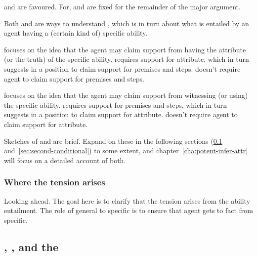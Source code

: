 \begin{note}
  \AR{} and \WR{} are favoured.
  For, \gsi{} and \aben{} are fixed for the remainder of the major argument.
\end{note}

\begin{note}
  Both \AR{} and \WR{} are ways to understand \aben{}, which is in turn about what is entailed by an agent having a (certain kind of) specific ability.

  \AR{} focuses on the idea that the agent may claim support from having the attribute (or the truth) of the specific ability.
  \AR{} requires support for attribute, which in turn suggests in a position to claim support for premises and steps.
  \AR{} doesn't require agent to claim support for premises and steps.

  \WR{} focuses on the idea that the agent may claim support from witnessing (or using) the specific ability.
  \WR{} requires support for premises and steps, which in turn suggests in a position to claim support for attribute.
  \WR{} doesn't require agent to claim support for attribute.
\end{note}

\begin{note}
  Sketches of \AR{} and \WR{} are brief.
  Expand on these in the following sections (\ref{sec:first-conditional} and~\ref{sec:second-conditional}) to some extent, and chapter~\ref{cha:potent-infer-attr} will focus on a detailed account of both.
\end{note}

\subsubsection{Where the tension arises}
\label{sec:where-tension-arises}

\begin{note}
  {
    \color{red}
    Looking ahead.
  }
  The goal here is to clarify that the tension arises from the ability entailment.
  The role of general to specific is to ensure that agent gets to fact from specific.
  
\end{note}


\subsection{\ESU{}, \gsi{}, and the \aben{}}
\label{sec:first-conditional}

